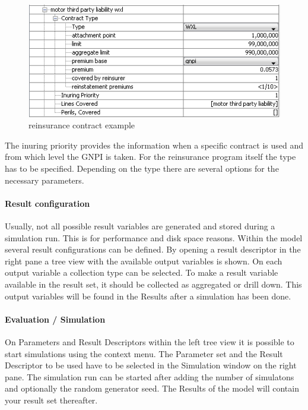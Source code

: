 \begin{figure}
	\centering
		\includegraphics[scale=0.75]{images/podra-reinsurance.png}
	\caption{\PODRA{} reinsurance contract example}
	\label{fig:podra-ri-contract}
\end{figure}

The inuring priority provides the information when a specific contract is used and from
which level \eg the GNPI is taken. For the reinsurance program itself the type has to be
specified. Depending on the type there are several options for the necessary parameters.

\paragraph{Result configuration}
Usually, not all possible result variables are generated and stored during a
simulation run. This is for performance and disk space reasons. Within the \PODRA{} model several result configurations can be defined. By opening a result descriptor
in the right pane a tree view with the available output variables is shown. On each output
variable a collection type can be selected. To make a result variable available in the
result set, it should be collected as aggregated or drill down. This output variables will be found in
the Results after a simulation has been done.


\paragraph{Evaluation / Simulation} 
On Parameters and Result Descriptors within the left tree view it is possible
to start simulations using the context menu. The Parameter set and the Result Descriptor to be used have to be selected in the Simulation window on the right pane.
The simulation run can be started after adding the number of simulatons and optionally
the random generator seed. The Results of the \PODRA{} model will contain your result set thereafter.

